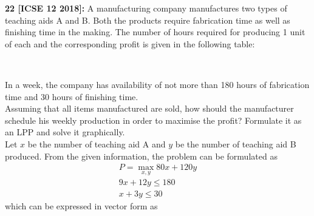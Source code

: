 \documentclass[journal,12pt,twocolumn]{IEEEtran}
\begin{document}


\begin{flushleft}
    \textbf{22 [ICSE 12 2018]: } A manufacturing company manufactures two types of teaching aids A and B. Both the products require fabrication time as well as finishing time in the making. The number of hours required for producing 1 unit of each and the corresponding profit is given in the following table:\\
    \begin{table}[htb]
        \tiny
        \\
        \caption{}
    \end{table}
    In a week, the company has availability of not more than 180 hours of fabrication time and 30 hours of finishing time.\\
    Assuming that all items manufactured are sold, how should the manufacturer schedule his weekly production in order to maximise the profit? Formulate it as an LPP and solve it graphically.\\
    \solution Let $x$ be the number of teaching aid A and $y$ be the number of teaching aid B produced.  From the given information, the problem can be formulated as
    \begin{align}
        P = \max_{x,y}80x+120y
        \\
        9x+12y \le 180
        \\
        x+3y \le 30
    \end{align}
    which can be expressed in vector form as
    \begin{align}

\end{align}
\end{flushleft}
\end{document}
